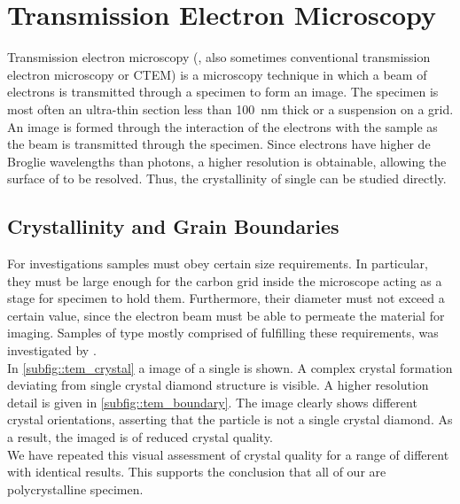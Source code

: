 		\section{Transmission Electron Microscopy}{\label{sec::tem}}

			Transmission electron microscopy (\TEM, also sometimes conventional transmission electron microscopy or CTEM) is a microscopy technique in which a beam of electrons is transmitted through a specimen to form an image. The specimen is most often an ultra-thin section less than \SI{100}{\nm} thick or a suspension on a grid. An image is formed through the interaction of the electrons with the sample as the beam is transmitted through the specimen.
			Since electrons have higher de Broglie wavelengths than photons, a higher resolution is obtainable, allowing the surface of \nds to be resolved. Thus, the crystallinity of single \nds can be studied directly.


			\subsection{Crystallinity and Grain Boundaries}\label{subsection::tem_crystal}

				For \TEM investigations \nd samples must obey certain size requirements.
				In particular, they must be large enough for the carbon grid inside the microscope acting as a stage for specimen to hold them.
				Furthermore, their diameter must not exceed a certain value, since the \TEM electron beam must be able to permeate the material for imaging.
				Samples of type \insituH mostly comprised of \nds fulfilling these requirements, was investigated by \schmauch.
				\\
				In \autoref{subfig::tem_crystal} a \TEM image of a single \nd is shown. A complex crystal formation deviating from single crystal diamond structure is visible. A higher resolution detail is given in \autoref{subfig::tem_boundary}. The image clearly shows different crystal orientations, asserting that the \nd particle is not a single crystal diamond. As a result, the imaged \nd is of reduced crystal quality.
				\\
				We have repeated this visual assessment of crystal quality for a range of different \nds with identical results. This supports the conclusion that all of our \nds are polycrystalline specimen.

